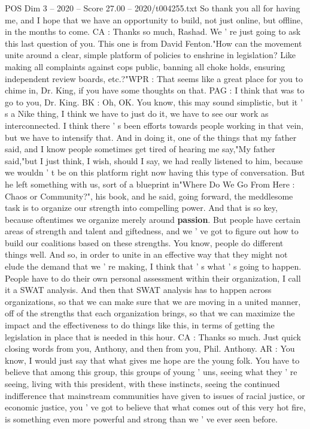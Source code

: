 \begin{textsample}{POS Dim 3 – 2020 – Score 27.00 – 2020/t004255.txt}
So thank you all for having me, and I hope that we have an opportunity to build, not just online, but offline, in the months to come.
CA : Thanks so much, Rashad.
We ' re just going to ask this last question of you.
This one is from David Fenton."How can the movement unite around a clear, simple platform of policies to enshrine in legislation?
Like making all complaints against cops public, banning all choke holds, ensuring independent review boards, etc.?"WPR : That seems like a great place for you to chime in, Dr.
King, if you have some thoughts on that.
PAG : I think that was to go to you, Dr.
King.
BK : Oh, OK.
You know, this may sound simplistic, but it ' s a Nike thing, I think we have to just do it, we have to see our work as interconnected.
I think there ' s been efforts towards people working in that vein, but we have to intensify that.
And in doing it, one of the things that my father said, and I know people sometimes get tired of hearing me say,"My father said,"but I just think, I wish, should I say, we had really listened to him, because we wouldn ' t be on this platform right now having this type of conversation.
But he left something with us, sort of a blueprint in"Where Do We Go From Here : Chaos or Community?", his book, and he said, going forward, the meddlesome task is to organize our strength into compelling power.
And that is so key, because oftentimes we organize merely around \textbf{passion}.
But people have certain areas of strength and talent and giftedness, and we ' ve got to figure out how to build our coalitions based on these strengths.
You know, people do different things well.
And so, in order to unite in an effective way that they might not elude the demand that we ' re making, I think that ' s what ' s going to happen.
People have to do their own personal assessment within their organization, I call it a SWAT analysis.
And then that SWAT analysis has to happen across organizations, so that we can make sure that we are moving in a united manner, off of the strengths that each organization brings, so that we can maximize the impact and the effectiveness to do things like this, in terms of getting the legislation in place that is needed in this hour.
CA : Thanks so much.
Just quick closing words from you, Anthony, and then from you, Phil.
Anthony.
AR : You know, I would just say that what gives me hope are the young folk.
You have to believe that among this group, this groups of young ' uns, seeing what they ' re seeing, living with this president, with these instincts, seeing the continued indifference that mainstream communities have given to issues of racial justice, or economic justice, you ' ve got to believe that what comes out of this very hot fire, is something even more powerful and strong than we ' ve ever seen before.

\end{textsample}
